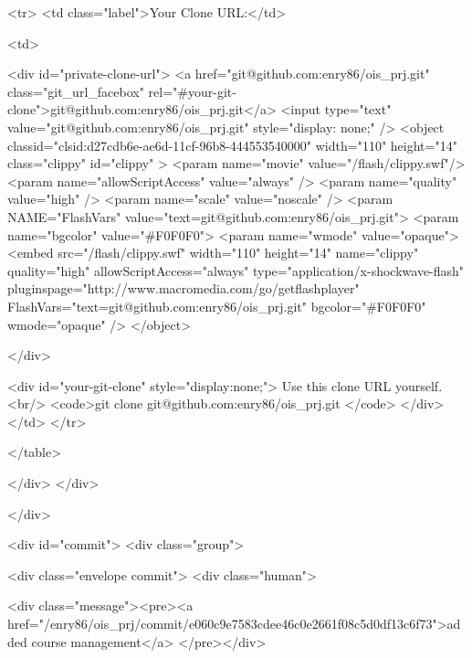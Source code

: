           
          <tr>
            <td class="label">Your Clone URL:</td>
            
            <td>

              <div id="private-clone-url">
                <a href="git@github.com:enry86/ois_prj.git" class="git_url_facebox" rel="#your-git-clone">git@github.com:enry86/ois_prj.git</a>
                <input type="text" value="git@github.com:enry86/ois_prj.git" style="display: none;" />
                      <object classid="clsid:d27cdb6e-ae6d-11cf-96b8-444553540000"
              width="110"
              height="14"
              class="clippy"
              id="clippy" >
      <param name="movie" value="/flash/clippy.swf"/>
      <param name="allowScriptAccess" value="always" />
      <param name="quality" value="high" />
      <param name="scale" value="noscale" />
      <param NAME="FlashVars" value="text=git@github.com:enry86/ois_prj.git">
      <param name="bgcolor" value="#F0F0F0">
      <param name="wmode" value="opaque">
      <embed src="/flash/clippy.swf"
             width="110"
             height="14"
             name="clippy"
             quality="high"
             allowScriptAccess="always"
             type="application/x-shockwave-flash"
             pluginspage="http://www.macromedia.com/go/getflashplayer"
             FlashVars="text=git@github.com:enry86/ois_prj.git"
             bgcolor="#F0F0F0"
             wmode="opaque"
      />
      </object>

              </div>

              <div id="your-git-clone" style="display:none;">
                Use this clone URL yourself.
                <br/>
                <code>git clone git@github.com:enry86/ois_prj.git </code>
              </div>
            </td>
          </tr>
          
          

          

          
      </table>

          </div>
  </div>






</div>


  <div id="commit">
    <div class="group">
        
  <div class="envelope commit">
    <div class="human">
      
        <div class="message"><pre><a href="/enry86/ois_prj/commit/e060c9e7583cdee46c0e2661f08c5d0df13c6f73">added course management</a> </pre></div>
      

